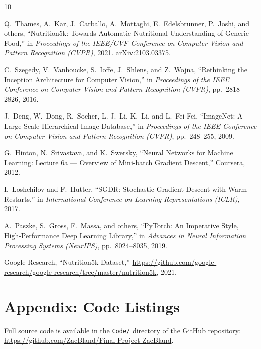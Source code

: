 \documentclass[11pt,a4paper]{article}
\begin{document}
\begin{thebibliography}{10}

Q.~Thames, A.~Kar, J.~Carballo, A.~Mottaghi, E.~Edelsbrunner, P.~Joshi, and others,
``Nutrition5k: Towards Automatic Nutritional Understanding of Generic Food,''
in \textit{Proceedings of the IEEE/CVF Conference on Computer Vision and Pattern Recognition (CVPR)}, 2021.
arXiv:2103.03375.

C.~Szegedy, V.~Vanhoucke, S.~Ioffe, J.~Shlens, and Z.~Wojna,
``Rethinking the Inception Architecture for Computer Vision,''
in \textit{Proceedings of the IEEE Conference on Computer Vision and Pattern Recognition (CVPR)}, pp.~2818--2826, 2016.

J.~Deng, W.~Dong, R.~Socher, L.-J.~Li, K.~Li, and L.~Fei-Fei,
``ImageNet: A Large-Scale Hierarchical Image Database,''
in \textit{Proceedings of the IEEE Conference on Computer Vision and Pattern Recognition (CVPR)}, pp.~248--255, 2009.

G.~Hinton, N.~Srivastava, and K.~Swersky,
``Neural Networks for Machine Learning: Lecture 6a --- Overview of Mini-batch Gradient Descent,''
Coursera, 2012.

I.~Loshchilov and F.~Hutter,
``SGDR: Stochastic Gradient Descent with Warm Restarts,''
in \textit{International Conference on Learning Representations (ICLR)}, 2017.

A.~Paszke, S.~Gross, F.~Massa, and others,
``PyTorch: An Imperative Style, High-Performance Deep Learning Library,''
in \textit{Advances in Neural Information Processing Systems (NeurIPS)}, pp.~8024--8035, 2019.

Google Research,
``Nutrition5k Dataset,''
\url{https://github.com/google-research/google-research/tree/master/nutrition5k}, 2021.

\end{thebibliography}

\newpage
\appendix
\section{Appendix: Code Listings}
\label{sec:appendix}

Full source code is available in the \texttt{Code/} directory of the GitHub repository: \url{https://github.com/ZacBland/Final-Project-ZacBland}.
\end{document}
